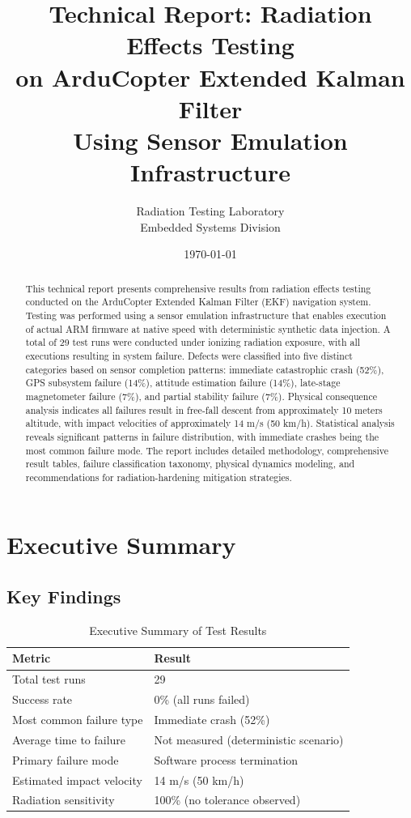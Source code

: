 \documentclass[11pt,a4paper]{article}
\title{\textbf{Technical Report: Radiation Effects Testing\\on ArduCopter Extended Kalman Filter\\Using Sensor Emulation Infrastructure}}
\author{Radiation Testing Laboratory\\Embedded Systems Division}
\date{\today}
\begin{document}
\maketitle

\begin{abstract}
This technical report presents comprehensive results from radiation effects testing conducted on the ArduCopter Extended Kalman Filter (EKF) navigation system. Testing was performed using a sensor emulation infrastructure that enables execution of actual ARM firmware at native speed with deterministic synthetic data injection. A total of 29 test runs were conducted under ionizing radiation exposure, with all executions resulting in system failure. Defects were classified into five distinct categories based on sensor completion patterns: immediate catastrophic crash (52\%), GPS subsystem failure (14\%), attitude estimation failure (14\%), late-stage magnetometer failure (7\%), and partial stability failure (7\%). Physical consequence analysis indicates all failures result in free-fall descent from approximately 10 meters altitude, with impact velocities of approximately 14 m/s (50 km/h). Statistical analysis reveals significant patterns in failure distribution, with immediate crashes being the most common failure mode. The report includes detailed methodology, comprehensive result tables, failure classification taxonomy, physical dynamics modeling, and recommendations for radiation-hardening mitigation strategies.
\end{abstract}

\clearpage
\tableofcontents
\clearpage

\section{Executive Summary}

\subsection{Key Findings}

\begin{table}[H]
\centering
\caption{Executive Summary of Test Results}
\label{tab:exec_summary}
\begin{tabular}{@{}p{6cm}p{7cm}@{}}
\toprule
\textbf{Metric} & \textbf{Result} \\
\midrule
Total test runs & 29 \\
Success rate & 0\% (all runs failed) \\
Most common failure type & Immediate crash (52\%) \\
Average time to failure & Not measured (deterministic scenario) \\
Primary failure mode & Software process termination \\
Estimated impact velocity & 14 m/s (50 km/h) \\
Radiation sensitivity & 100\% (no tolerance observed) \\
\bottomrule
\end{tabular}
\end{table}
\end{document}
